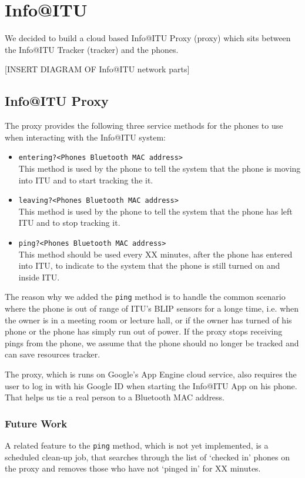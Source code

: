 \section{Info@ITU}
We decided to build a cloud based Info@ITU Proxy (proxy) which sits between the Info@ITU Tracker (tracker) and the phones.

[INSERT DIAGRAM OF Info@ITU network parts]

\subsection{Info@ITU Proxy}
The proxy provides the following three service methods for the phones to use when interacting with the Info@ITU system:

\begin{itemize}
\item \texttt{entering?<Phones Bluetooth MAC address>}\\
This method is used by the phone to tell the system that the phone is moving into ITU and to start tracking the it.
\item \texttt{leaving?<Phones Bluetooth MAC address>}\\
This method is used by the phone to tell the system that the phone has left ITU and to stop tracking it.
\item \texttt{ping?<Phones Bluetooth MAC address>}\\
This method should be used every XX minutes, after the phone has entered into ITU, to indicate to the system that the phone is still turned on and inside ITU.
\end{itemize}

The reason why we added the \texttt{ping} method is to handle the common scenario where the phone is out of range of ITU's BLIP sensors for a longe time, i.e. when the owner is in a meeting room or lecture hall, or if the owner has turned of his phone or the phone has simply run out of power. If the proxy stops receiving pings from the phone, we assume that the phone should no longer be tracked and can save resources tracker.

The proxy, which is runs on Google's App Engine cloud service, also requires the user to log in with his Google ID when starting the Info@ITU App on his phone. That helps us tie a real person to a Bluetooth MAC address.

\subsubsection{Future Work}
A related feature to the \texttt{ping} method, which is not yet implemented, is a scheduled clean-up job, that searches through the list of `checked in' phones on the proxy and removes those who have not `pinged in' for XX minutes.

